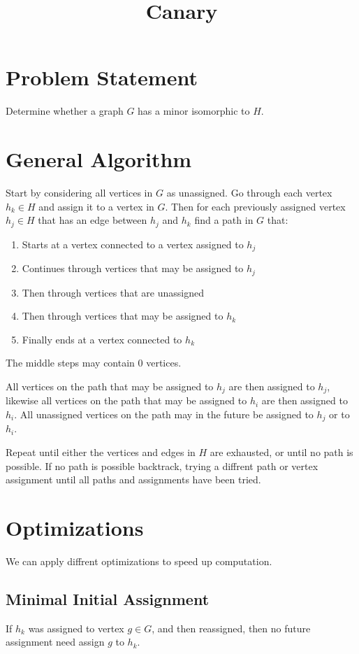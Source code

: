 \documentclass[11pt,twocolumn]{article}
\title{Canary}
\begin{document}
\maketitle

\section{Problem Statement}
Determine whether a graph $G$ has a minor isomorphic to $H$. 

\section{General Algorithm}
Start by considering all vertices in $G$ as unassigned.
Go through each vertex $h_k \in H$ and assign it to a vertex in $G$.
Then for each previously assigned vertex $h_j \in H$ that has an edge between $h_j$ and $h_k$ find a path in $G$ that:
\begin{enumerate}
\item Starts at a vertex connected to a vertex assigned to $h_j$
\item Continues through vertices that may be assigned to $h_j$
\item Then through vertices that are unassigned
\item Then through vertices that may be assigned to $h_k$
\item Finally ends at a vertex connected to $h_k$
\end{enumerate}
The middle steps may contain $0$ vertices.

All vertices on the path that may be assigned to $h_j$ are then assigned to $h_j$,
  likewise all vertices on the path that may be assigned to $h_i$ are then assigned to $h_i$.
All unassigned vertices on the path may in the future be assigned to $h_j$ or to $h_i$.

Repeat until either the vertices and edges in $H$ are exhausted, or until no path is possible.
If no path is possible backtrack, trying a diffrent path or vertex assignment until all paths and assignments have been tried.

\section{Optimizations}
We can apply diffrent optimizations to speed up computation.
\subsection{Minimal Initial Assignment}
If $h_k$ was assigned to vertex $g \in G$, and then reassigned, then no future assignment need assign $g$ to $h_k$.
\end{document}
